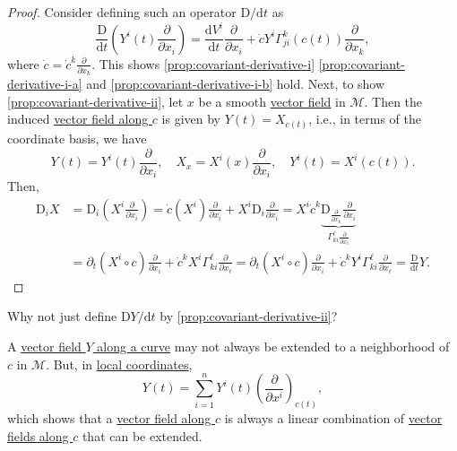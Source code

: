 \begin{proof}
	Consider defining such an operator \(\mathrm{D} / \mathrm{d} t\) as
	\[
		\frac{\mathrm{D}}{\mathrm{d}t} \left( Y^i (t)\frac{\partial}{\partial x_i} \right)
		= \frac{\mathrm{d}V^i}{\mathrm{d}t} \frac{\partial}{\partial x_i} + \dot{c}Y^i \Gamma _{ji}^k(c(t)) \frac{\partial}{\partial x_k},
	\]
	where \(\dot{c} = \dot{c}^k \frac{\partial}{\partial x_k}\). This shows \autoref{prop:covariant-derivative-i} \autoref{prop:covariant-derivative-i-a} and \autoref{prop:covariant-derivative-i-b} hold. Next, to show \autoref{prop:covariant-derivative-ii}, let \(x\) be a smooth \hyperref[def:vector-field]{vector field} in \(\mathcal{M} \). Then the induced \hyperref[def:vector-field-along-curve]{vector field along \(c\)} is given by \(Y(t)=X_{c(t)}\), i.e., in terms of the coordinate basis, we have
	\[
		Y(t) = Y^i(t)\frac{\partial}{\partial x_i},\quad X_x= X^i(x)\frac{\partial}{\partial x_i},\quad Y^i(t) = X^i (c(t)).
	\]
	Then,
	\[
		\begin{split}
			\mathrm{D} _i X
			&= \mathrm{D} _i \left( X^i \frac{\partial}{\partial x_i} \right)
			= \dot{c}(X^i)\frac{\partial}{\partial x_i} + X^i \mathrm{D} _i\frac{\partial}{\partial x_i}
			= X^i \dot{c}^k \underbrace{\mathrm{D} _{\frac{\partial}{\partial x_k}} \frac{\partial}{\partial x_i}}_{\Gamma _{ki}^{\ell } \frac{\partial}{\partial x_{\ell}}}\\
			&= \partial _t(X^i \circ c)\frac{\partial}{\partial x_i} + \dot{c}^k X^i \Gamma ^\ell _{ki} \frac{\partial}{\partial x_{\ell}}
			= \partial _t(X^i \circ c)\frac{\partial}{\partial x_i} + \dot{c}^k Y^i \Gamma ^\ell _{ki} \frac{\partial}{\partial x_{\ell }}
			= \frac{\mathrm{D}}{\mathrm{d} t} Y.
		\end{split}
	\]
\end{proof}

\begin{problem}
Why not just define \(\mathrm{D} Y / \mathrm{d} t\) by \autoref{prop:covariant-derivative-ii}?
\end{problem}
\begin{answer}
	A \hyperref[def:vector-field-along-curve]{vector field \(Y\) along a curve} may not always be extended to a neighborhood of \(c\) in \(\mathcal{M} \). But, in \hyperref[def:coordinate-chart]{local coordinates},
	\[
		Y(t) = \sum_{i=1}^{n} Y^i (t) \left( \frac{\partial }{\partial x^i} \right) _{c(t)},
	\]
	which shows that a \hyperref[def:vector-field-along-curve]{vector field along \(c\)} is always a linear combination of \hyperref[def:vector-field-along-curve]{vector fields along \(c\)} that can be extended.
\end{answer}

